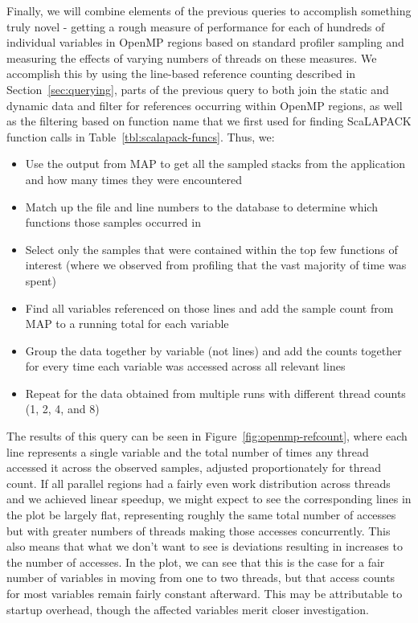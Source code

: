 Finally, we will combine elements of the previous queries to accomplish something truly novel - 
getting a rough measure of performance for each of hundreds of individual variables in OpenMP 
regions based on standard profiler sampling and measuring the effects of varying numbers of 
threads on these measures.
We accomplish this by using the line-based reference counting described in 
Section~\ref{sec:querying}, parts of the previous query to both join the static and dynamic data and 
filter for references occurring within OpenMP regions, as well as the filtering based on function name 
that we first used for finding ScaLAPACK function calls in Table~\ref{tbl:scalapack-funcs}.
Thus, we:
\begin{itemize}
\item Use the output from MAP to get all the sampled stacks from the application and how many 
times they were encountered
\item Match up the file and line numbers to the database to determine which functions those samples 
occurred in
\item Select only the samples that were contained within the top few functions of interest (where we 
observed from profiling that the vast majority of time was spent)
\item Find all variables referenced on those lines and add the sample count from MAP to a running 
total for each variable
\item Group the data together by variable (not lines) and add the counts together for every time each 
variable was accessed across all relevant lines
\item Repeat for the data obtained from multiple runs with different thread counts (1, 2, 4, and 8)
\end{itemize}
The results of this query can be seen in Figure~\ref{fig:openmp-refcount}, where each line 
represents a single variable and the total number of times any thread accessed it across the 
observed samples, adjusted proportionately for thread count.
If all parallel regions had a fairly even work distribution across threads and we achieved linear 
speedup, we might expect to see the corresponding lines in the plot be largely flat, representing 
roughly the same total number of accesses but with greater numbers of threads making those 
accesses concurrently.
This also means that what we don't want to see is deviations resulting in increases to the number of 
accesses.
In the plot, we can see that this is the case for a fair number of variables in moving from one to two 
threads, but that access counts for most variables remain fairly constant afterward.
This may be attributable to startup overhead, though the affected variables merit closer investigation.

